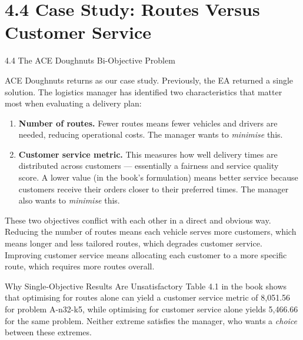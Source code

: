 \documentclass[aspectratio=169,10pt]{beamer}
\begin{document}
\section{4.4 Case Study: Routes Versus Customer Service}

\begin{frame}[allowframebreaks]{4.4 The ACE Doughnuts Bi-Objective Problem}

  ACE Doughnuts returns as our case study.  Previously, the EA returned a single
  solution.  The logistics manager has identified two characteristics that matter
  most when evaluating a delivery plan:

  \begin{enumerate}
    \item \textbf{Number of routes.}  Fewer routes means fewer vehicles and drivers
      are needed, reducing operational costs.  The manager wants to \emph{minimise}
      this.
    \item \textbf{Customer service metric.}  This measures how well delivery times
      are distributed across customers --- essentially a fairness and service quality
      score.  A lower value (in the book's formulation) means better service because
      customers receive their orders closer to their preferred times.  The manager
      also wants to \emph{minimise} this.
    \end{enumerate}

  These two objectives conflict with each other in a direct and obvious way.
  Reducing the number of routes means each vehicle serves more customers, which
  means longer and less tailored routes, which degrades customer service.
  Improving customer service means allocating each customer to a more specific
  route, which requires more routes overall.

  \framebreak

  \begin{alertblock}{Why Single-Objective Results Are Unsatisfactory}
    Table 4.1 in the book shows that optimising for routes alone can yield a
    customer service metric of 8{,}051.56 for problem A-n32-k5, while optimising
    for customer service alone yields 5{,}466.66 for the same problem.  Neither
    extreme satisfies the manager, who wants a \emph{choice} between these
    extremes.
  \end{alertblock}


\end{frame}
\end{document}
